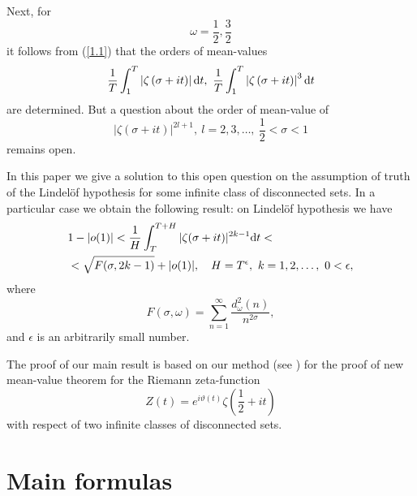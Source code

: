 \documentclass{amsart}
\theoremstyle{definition}
\theoremstyle{remark}
\numberwithin{equation}{section}
\begin{document}
\subsection{}

Next, for
\begin{displaymath}
\omega=\frac 12,\frac 32
\end{displaymath}
it follows from (\ref{1.1})  that the orders of mean-values
\begin{displaymath}
\frac 1T \int_1^T \left|\zeta\left(\sigma+it\right)\right|{\rm d}t,\
\frac 1T \int_1^T \left|\zeta\left(\sigma+it\right)\right|^3{\rm d}t
\end{displaymath}
are determined. But a question about the order of mean-value of
\begin{displaymath}
|\zeta(\sigma+it)|^{2l+1},\ l=2,3,\dots,\ \frac 12<\sigma<1
\end{displaymath}
remains open.

In this paper we give a solution to this open question on the assumption of truth of the Lindel\" of
hypothesis for some infinite class of disconnected sets. In a particular case we obtain the following result: on
Lindel\" of hypothesis we have
\begin{equation} \label{1.2}
\begin{split}
 & 1-|o(1)|<\frac 1H\int_T^{T+H}|\zeta(\sigma+it)|^{2k-1}{\rm d}t < \\
 & < \sqrt{F(\sigma,2k-1)}+|o(1)|,\quad H=T^\epsilon,\ k=1,2,\dots,\ 0<\epsilon ,
\end{split}
\end{equation}
where
\begin{equation} \label{1.3}
F(\sigma,\omega)=\sum_{n=1}^\infty \frac{d^2_{\omega}(n)}{n^{2\sigma}},
\end{equation}
and $\epsilon$ is an arbitrarily small number.

The proof of our main result is based on our method (see \cite{4}) for the proof of new mean-value theorem for the
Riemann zeta-function
\begin{displaymath}
Z(t)=e^{i{\vartheta}(t)}{\zeta\left(\frac{1}{2}+it\right)}
\end{displaymath}
with respect of two infinite classes of disconnected sets.

\section{Main formulas}
\end{document}
